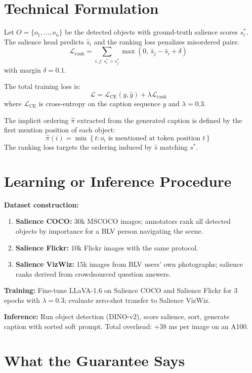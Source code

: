 \documentclass[10pt,twocolumn]{article}
\begin{document}
\section{Technical Formulation}

Let $O = \{o_1, \ldots, o_n\}$ be the detected objects with ground-truth
salience scores $s^*_i$. The salience head predicts $\hat{s}_i$ and
the ranking loss penalizes misordered pairs:
\[
  \mathcal{L}_\text{rank} = \sum_{i,j:\, s^*_i > s^*_j}
    \max\!\left(0,\, \hat{s}_j - \hat{s}_i + \delta\right)
\]
with margin $\delta = 0.1$.

The total training loss is:
\[
  \mathcal{L} = \mathcal{L}_\text{CE}(y, \hat{y}) + \lambda \mathcal{L}_\text{rank}
\]
where $\mathcal{L}_\text{CE}$ is cross-entropy on the caption sequence
$y$ and $\lambda = 0.3$.

The implicit ordering $\hat{\pi}$ extracted from the generated caption is
defined by the first mention position of each object:
\[
  \hat{\pi}(i) = \min\!\left\{t : o_i \text{ is mentioned at token position } t\right\}
\]
The ranking loss targets the ordering induced by $\hat{s}$ matching $s^*$.

\section{Learning or Inference Procedure}

\textbf{Dataset construction:}
\begin{enumerate}[itemsep=2pt,parsep=0pt]
  \item \textbf{Salience COCO:} 30k MSCOCO images; annotators rank all
    detected objects by importance for a BLV person navigating the scene.
  \item \textbf{Salience Flickr:} 10k Flickr images with the same protocol.
  \item \textbf{Salience VizWiz:} 15k images from BLV users' own
    photographs; salience ranks derived from crowdsourced question answers.
\end{enumerate}

\textbf{Training:} Fine-tune LLaVA-1.6 on Salience COCO and Salience
Flickr for 3 epochs with $\lambda = 0.3$; evaluate zero-shot transfer
to Salience VizWiz.

\textbf{Inference:} Run object detection (DINO-v2), score salience,
sort, generate caption with sorted soft prompt. Total overhead: $+38$ ms
per image on an A100.

\section{What the Guarantee Says}
\end{document}
